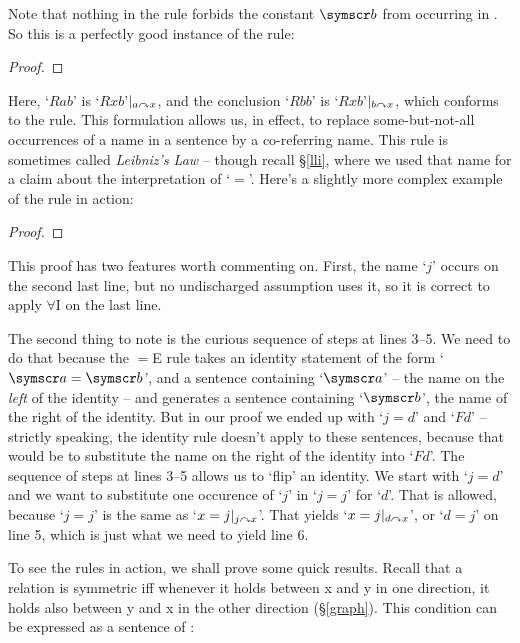 Note that nothing in the rule forbids the constant $\meta{b}$ from occurring in . So this is a perfectly good instance of the rule: \begin{proof}
\end{proof} Here, `$Rab$' is `$Rxb$'$\vert_{a\curvearrowright x}$, and the conclusion `$Rbb$' is `$Rxb$'$\vert_{b\curvearrowright x}$, which conforms to the rule. This formulation allows us, in effect, to replace some-but-not-all occurrences of a name in a sentence by a co-referring name.
This rule is sometimes called \emph{Leibniz's Law} – though recall §\ref{lli}, where we used that name for a claim about the interpretation of `$=$'. Here's a slightly more complex example of the rule in action: \begin{proof}
	\open
	\idi{}
\end{proof} This proof has two features worth commenting on. First, the name `$j$' occurs on the second last line, but no undischarged assumption uses it, so it is correct to apply $\forall$I on the last line. 

The second thing to note is the curious sequence of steps at lines 3–5. We need to do that because the $=$E rule takes an identity statement of the form `$\meta{a}=\meta{b}$', and a sentence containing `$\meta{a}$' – the name on the \emph{left} of the identity – and generates a sentence containing `$\meta{b}$', the name of the right of the identity. But in our proof we ended up with `$j=d$' and `$Fd$' – strictly speaking, the identity rule doesn't apply to these sentences, because that would be to substitute the name on the right of the identity into `$Fd$'. The sequence of steps at lines 3–5 allows us to `flip' an identity. We start with `$j=d$' and we want to substitute one occurence of `$j$' in `$j=j$' for `$d$'. That is allowed, because `$j=j$' is the same as `$x=j\vert_{j\curvearrowright x}$'. That yields `$x=j\vert_{d\curvearrowright x}$', or `$d=j$' on line 5, which is just what we need to yield line 6.

To see the rules in action, we shall prove some quick results. Recall that a relation is symmetric iff whenever it holds between x and y in one direction, it holds also between y and x in the other direction (§\ref{graph}). This condition can be expressed as a sentence of \FOL: 


